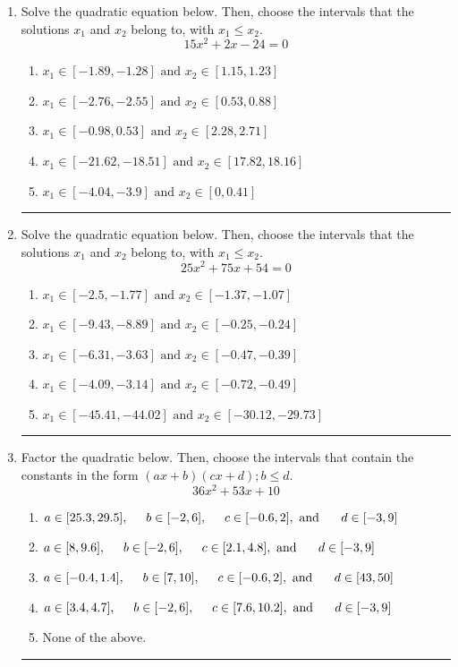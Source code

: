 \documentclass[14pt]{extbook}
\newcommand{\litem}[1]{\item#1\hspace*{-1cm}\rule{\textwidth}{0.4pt}}
\begin{document}
\begin{enumerate}
\litem{
Solve the quadratic equation below. Then, choose the intervals that the solutions $x_1$ and $x_2$ belong to, with $x_1 \leq x_2$.\[ 15x^{2} +2 x -24 = 0 \]\begin{enumerate}[label=\Alph*.]
\item \( x_1 \in [-1.89, -1.28] \text{ and } x_2 \in [1.15, 1.23] \)
\item \( x_1 \in [-2.76, -2.55] \text{ and } x_2 \in [0.53, 0.88] \)
\item \( x_1 \in [-0.98, 0.53] \text{ and } x_2 \in [2.28, 2.71] \)
\item \( x_1 \in [-21.62, -18.51] \text{ and } x_2 \in [17.82, 18.16] \)
\item \( x_1 \in [-4.04, -3.9] \text{ and } x_2 \in [0, 0.41] \)

\end{enumerate} }
\litem{
Solve the quadratic equation below. Then, choose the intervals that the solutions $x_1$ and $x_2$ belong to, with $x_1 \leq x_2$.\[ 25x^{2} +75 x + 54 = 0 \]\begin{enumerate}[label=\Alph*.]
\item \( x_1 \in [-2.5, -1.77] \text{ and } x_2 \in [-1.37, -1.07] \)
\item \( x_1 \in [-9.43, -8.89] \text{ and } x_2 \in [-0.25, -0.24] \)
\item \( x_1 \in [-6.31, -3.63] \text{ and } x_2 \in [-0.47, -0.39] \)
\item \( x_1 \in [-4.09, -3.14] \text{ and } x_2 \in [-0.72, -0.49] \)
\item \( x_1 \in [-45.41, -44.02] \text{ and } x_2 \in [-30.12, -29.73] \)

\end{enumerate} }
\litem{
Factor the quadratic below. Then, choose the intervals that contain the constants in the form $(ax+b)(cx+d); b \leq d.$\[ 36x^{2} +53 x + 10 \]\begin{enumerate}[label=\Alph*.]
\item \( a \in [25.3, 29.5], \hspace*{5mm} b \in [-2, 6], \hspace*{5mm} c \in [-0.6, 2], \text{ and } \hspace*{5mm} d \in [-3, 9] \)
\item \( a \in [8, 9.6], \hspace*{5mm} b \in [-2, 6], \hspace*{5mm} c \in [2.1, 4.8], \text{ and } \hspace*{5mm} d \in [-3, 9] \)
\item \( a \in [-0.4, 1.4], \hspace*{5mm} b \in [7, 10], \hspace*{5mm} c \in [-0.6, 2], \text{ and } \hspace*{5mm} d \in [43, 50] \)
\item \( a \in [3.4, 4.7], \hspace*{5mm} b \in [-2, 6], \hspace*{5mm} c \in [7.6, 10.2], \text{ and } \hspace*{5mm} d \in [-3, 9] \)
\item \( \text{None of the above.} \)


\end{enumerate}}
\end{enumerate}
\end{document}
